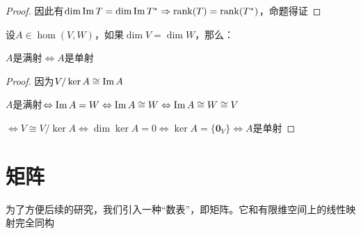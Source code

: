 \documentclass[12pt, a4paper, oneside, UTF8]{ctexbook}
\begin{document}
\begin{para}{0}
\begin{proof}
							因此有$\dim \operatorname{Im} T = \dim \operatorname{Im} T^* \Rightarrow \operatorname{rank}(T)=\operatorname{rank}(T^*)$，命题得证
						\end{proof}
					\point{}
						\begin{proposition}
							设$A \in \hom(V,W)$，如果$\dim V=\dim W$，那么：

							$A$是满射$\Leftrightarrow A$是单射
						\end{proposition}
						\begin{proof}
							因为$V/\ker A \cong \operatorname{Im} A$

							$A$是满射$\Leftrightarrow \operatorname{Im} A = W \Leftrightarrow \operatorname{Im} A \cong W \Leftrightarrow \operatorname{Im} A \cong W \cong V$

							$\Leftrightarrow V \cong V/\ker A \Leftrightarrow \dim \ker A = 0 \Leftrightarrow \ker A = \{\mathbf{0}_V\} \Leftrightarrow A$是单射
						\end{proof}
				\end{para}
	\section{矩阵}
		为了方便后续的研究，我们引入一种“数表”，即矩阵。它和有限维空间上的线性映射完全同构
\end{document}
